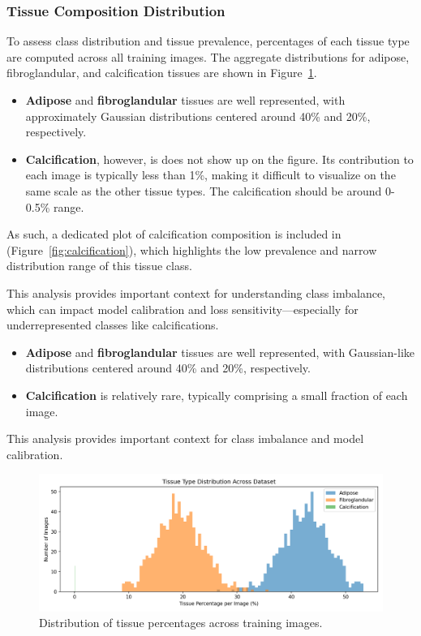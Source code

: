 \subsubsection{Tissue Composition Distribution}

To assess class distribution and tissue prevalence, percentages of each tissue type are computed across all training images. 
The aggregate distributions for adipose, fibroglandular, and calcification tissues are shown in Figure~\ref{fig:composition}. 

\begin{itemize}
    \item \textbf{Adipose} and \textbf{fibroglandular} tissues are well represented, with approximately Gaussian distributions centered around 40\% and 20\%, respectively.
    \item \textbf{Calcification}, however, is does not show up on the figure. Its contribution to each image is typically less than 1\%, making it difficult to visualize 
          on the same scale as the other tissue types. The calcification should be around 0-0.5\% range.
\end{itemize}

As such, a dedicated plot of calcification composition is included in (Figure~\ref{fig:calcification}), which highlights the low prevalence and narrow 
distribution range of this tissue class.

This analysis provides important context for understanding class imbalance, which can impact model calibration and loss sensitivity—especially for 
underrepresented classes like calcifications.

\begin{itemize}
    \item \textbf{Adipose} and \textbf{fibroglandular} tissues are well represented, with Gaussian-like distributions centered around 40\% and 20\%, respectively.
    \item \textbf{Calcification} is relatively rare, typically comprising a small fraction of each image.
\end{itemize}

This analysis provides important context for class imbalance and model calibration.

\begin{figure}[h!]
    \centering
    \includegraphics[width=\linewidth]{./fig/tissue_percentage_distribution.png}
    \caption{Distribution of tissue percentages across training images.}
    \label{fig:composition}
\end{figure}

